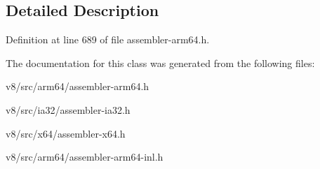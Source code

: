 \subsection{Detailed Description}


Definition at line 689 of file assembler-\/arm64.\+h.



The documentation for this class was generated from the following files\+:\begin{DoxyCompactItemize}
\item 
v8/src/arm64/assembler-\/arm64.\+h\item 
v8/src/ia32/assembler-\/ia32.\+h\item 
v8/src/x64/assembler-\/x64.\+h\item 
v8/src/arm64/assembler-\/arm64-\/inl.\+h\end{DoxyCompactItemize}
